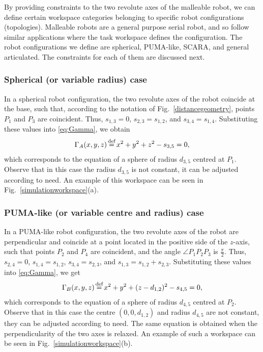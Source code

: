 By providing constraints to the two revolute axes of the malleable robot, we can define certain workspace categories belonging to specific robot configurations (topologies). Malleable robots are a general purpose serial robot, and so follow similar applications where the task workspace defines the configuration. The robot configurations we define are spherical, PUMA-like, SCARA, and general articulated. The constraints for each of them are discussed next.

\subsubsection{Spherical (or variable radius) case}
In a spherical robot configuration, the two revolute axes of the robot coincide at the base, such that, according to the notation of Fig.~\ref{distancegeometry}, points $P_1$ and $P_3$ are coincident. Thus, $s_{1,3} = 0$, $s_{2,3} = s_{1,2}$, and $s_{3,4} = s_{1,4}$. Substituting these values into \eqref{eq:Gamma}, we obtain
\begin{align}
    \Gamma_A(x, y, z) \myeq x^2 + y^2 + z^2 - s_{3,5}=0,
\end{align}
which corresponds to the equation of a sphere of radius $d_{3,5}$ centred at $P_1$. Observe that in this case the radius $d_{3,5}$ is not constant, it can be adjusted according to need. An example of this workspace can be seen in Fig.~\ref{simulationworkspace}(a).

\subsubsection{PUMA-like (or variable centre and radius) case}
In a PUMA-like robot configuration, the two revolute axes of the robot are perpendicular and coincide at a point located in the positive side of the $z$-axis, such that points $P_2$ and $P_4$ are coincident, and the angle $\angle P_1P_2P_3$ is $\frac{\pi}{2}$. Thus, $s_{2,4} = 0$, $s_{1,4} = s_{1,2}$, $s_{3,4} = s_{2,3}$, and $s_{1,3} = s_{1,2}+s_{2,3}$. Substituting these values into \eqref{eq:Gamma}, we get
\begin{align}
    \Gamma_B(x, y, z) \myeq x^2 + y^2 + (z-d_{1,2})^2-s_{4,5}=0,
\end{align}
which corresponds to the equation of a sphere of radius $d_{4,5}$ centred at $P_2$. Observe that in this case the centre $(0, 0, d_{1,2})$ and radius $d_{4,5}$ are not constant, they can be adjusted according to need. The same equation is obtained when the perpendicularity of the two axes is relaxed. An example of such a workspace can be seen in Fig.~\ref{simulationworkspace}(b).

